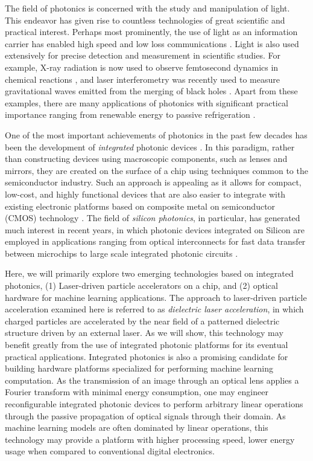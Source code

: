 
The field of photonics is concerned with the study and manipulation of light.
This endeavor has given rise to countless technologies of great scientific and practical interest.
Perhaps most prominently, the use of light as an information carrier has enabled high speed and low loss communications \cite{agrawal_fiber-optic_2012}.
Light is also used extensively for precise detection and measurement in scientific studies.  
For example, X-ray radiation is now used to observe femtosecond dynamics in chemical reactions \cite{kern_structures_2018}, and laser interferometry was recently used to measure gravitational waves emitted from the merging of black holes \cite{ligo_scientific_collaboration_and_virgo_collaboration_observation_2016}.
Apart from these examples, there are many applications of photonics with significant practical importance ranging from renewable energy \cite{carlson_amorphous_1976,yu_fundamental_2010} to passive refrigeration \cite{raman_passive_2014,hsu_radiative_2016}.

One of the most important achievements of photonics in the past few decades has been the development of \textit{integrated} photonic devices \cite{pollock_integrated_2010}.
In this paradigm, rather than constructing devices using macroscopic components, such as lenses and mirrors, they are created on the surface of a chip using techniques common to the semiconductor industry.
Such an approach is appealing as it allows for compact, low-cost, and highly functional devices that are also easier to integrate with existing electronic platforms based on composite metal on semiconductor (CMOS) technology \cite{weste_principles_1985}.
The field of \textit{silicon photonics}, in particular, has generated much interest in recent years, in which photonic devices integrated on Silicon are employed in applications ranging from optical interconnects for fast data transfer between microchips to large scale integrated photonic circuits \cite{jalali_silicon_2006}.

Here, we will primarily explore two emerging technologies based on integrated photonics, (1) Laser-driven particle accelerators on a chip, and (2) optical hardware for machine learning applications.
The approach to laser-driven particle acceleration examined here is referred to as \textit{dielectric laser acceleration}, in which charged particles are accelerated by the near field of a patterned dielectric structure driven by an external laser.
As we will show, this technology may benefit greatly from the use of integrated photonic platforms for its eventual practical applications.
Integrated photonics is also a promising candidate for building hardware platforms specialized for performing machine learning computation.
As the transmission of an image through an optical lens applies a Fourier transform with minimal energy consumption, one may engineer reconfigurable integrated photonic devices to perform arbitrary linear operations through the passive propagation of optical signals through their domain.
As machine learning models are often dominated by linear operations, this technology may provide a platform with higher processing speed, lower energy usage when compared to conventional digital electronics.

